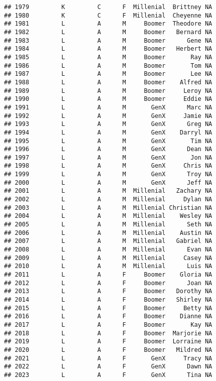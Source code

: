 \documentclass[
]{article}
\begin{document}
\begin{verbatim}
## 1979         K         C      F  Millenial  Brittney NA
## 1980         K         C      F  Millenial  Cheyenne NA
## 1981         L         A      M     Boomer  Theodore NA
## 1982         L         A      M     Boomer   Bernard NA
## 1983         L         A      M     Boomer      Gene NA
## 1984         L         A      M     Boomer   Herbert NA
## 1985         L         A      M     Boomer       Ray NA
## 1986         L         A      M     Boomer       Tom NA
## 1987         L         A      M     Boomer       Lee NA
## 1988         L         A      M     Boomer    Alfred NA
## 1989         L         A      M     Boomer     Leroy NA
## 1990         L         A      M     Boomer     Eddie NA
## 1991         L         A      M       GenX      Marc NA
## 1992         L         A      M       GenX     Jamie NA
## 1993         L         A      M       GenX      Greg NA
## 1994         L         A      M       GenX    Darryl NA
## 1995         L         A      M       GenX       Tim NA
## 1996         L         A      M       GenX      Dean NA
## 1997         L         A      M       GenX       Jon NA
## 1998         L         A      M       GenX     Chris NA
## 1999         L         A      M       GenX      Troy NA
## 2000         L         A      M       GenX      Jeff NA
## 2001         L         A      M  Millenial   Zachary NA
## 2002         L         A      M  Millenial     Dylan NA
## 2003         L         A      M  Millenial Christian NA
## 2004         L         A      M  Millenial    Wesley NA
## 2005         L         A      M  Millenial      Seth NA
## 2006         L         A      M  Millenial    Austin NA
## 2007         L         A      M  Millenial   Gabriel NA
## 2008         L         A      M  Millenial      Evan NA
## 2009         L         A      M  Millenial     Casey NA
## 2010         L         A      M  Millenial      Luis NA
## 2011         L         A      F     Boomer    Gloria NA
## 2012         L         A      F     Boomer      Joan NA
## 2013         L         A      F     Boomer   Dorothy NA
## 2014         L         A      F     Boomer   Shirley NA
## 2015         L         A      F     Boomer     Betty NA
## 2016         L         A      F     Boomer    Dianne NA
## 2017         L         A      F     Boomer       Kay NA
## 2018         L         A      F     Boomer  Marjorie NA
## 2019         L         A      F     Boomer  Lorraine NA
## 2020         L         A      F     Boomer   Mildred NA
## 2021         L         A      F       GenX     Tracy NA
## 2022         L         A      F       GenX      Dawn NA
## 2023         L         A      F       GenX      Tina NA

\end{verbatim}
\end{document}
